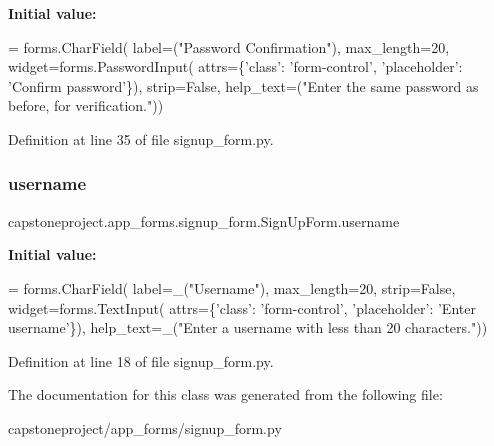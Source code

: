 {\bfseries Initial value\+:}
\begin{DoxyCode}
=  forms.CharField(
        label=(\textcolor{stringliteral}{"Password Confirmation"}),
        max\_length=20,
        widget=forms.PasswordInput(
            attrs=\{\textcolor{stringliteral}{'class'}: \textcolor{stringliteral}{'form-control'},
                   \textcolor{stringliteral}{'placeholder'}: \textcolor{stringliteral}{'Confirm password'}\}),
        strip=\textcolor{keyword}{False},
        help\_text=(\textcolor{stringliteral}{"Enter the same password as before, for verification."}))
\end{DoxyCode}


Definition at line 35 of file signup\+\_\+form.\+py.

\mbox{\label{classcapstoneproject_1_1app__forms_1_1signup__form_1_1_sign_up_form_a8c27b29909d5bd4dbb401b9fa89577a6}} 
\subsubsection{\texorpdfstring{username}{username}}
{\footnotesize\ttfamily capstoneproject.\+app\+\_\+forms.\+signup\+\_\+form.\+Sign\+Up\+Form.\+username\hspace{0.3cm}{\ttfamily [static]}}

{\bfseries Initial value\+:}
\begin{DoxyCode}
=  forms.CharField(
        label=\_(\textcolor{stringliteral}{"Username"}),
        max\_length=20,
        strip=\textcolor{keyword}{False},
        widget=forms.TextInput(
            attrs=\{\textcolor{stringliteral}{'class'}: \textcolor{stringliteral}{'form-control'},
                   \textcolor{stringliteral}{'placeholder'}: \textcolor{stringliteral}{'Enter username'}\}),
        help\_text=\_(\textcolor{stringliteral}{"Enter a username with less than 20 characters."}))
\end{DoxyCode}


Definition at line 18 of file signup\+\_\+form.\+py.



The documentation for this class was generated from the following file\+:\begin{DoxyCompactItemize}
\item 
capstoneproject/app\+\_\+forms/signup\+\_\+form.\+py\end{DoxyCompactItemize}
